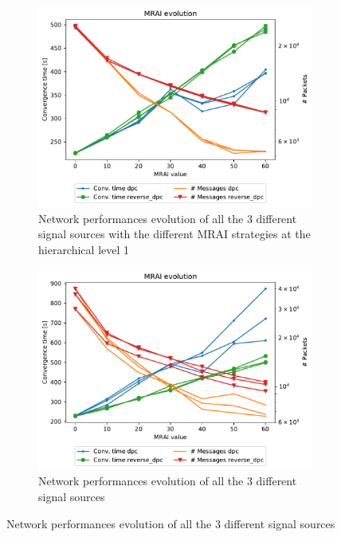 \begin{figure}[h]
     \centering
     \begin{subfigure}[b]{0.45\textwidth}
         \centering
         \includegraphics[width=\textwidth]{images/hierarchy/different_levels-1000_hier_1_all.pdf}
		 \caption{Network performances evolution of all the \num{3} different signal sources 
			with the different \ac{MRAI} strategies at the hierarchical level \num{1}}
         \label{fig:different_levels_1}
     \end{subfigure}
     \begin{subfigure}[b]{0.45\textwidth}
         \centering
         \includegraphics[width=\textwidth]{images/hierarchy/different_levels-1000_hier_2_all.pdf}
		 \caption{Network performances evolution of all the \num{3} different signal sources 
}
\end{subfigure}
\end{figure}
